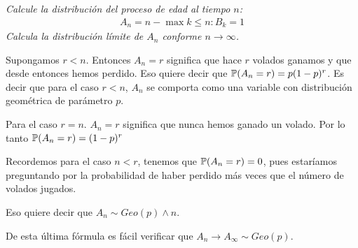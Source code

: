 \emph{
    Calcule la distribución del proceso de edad al tiempo $n$:
    \begin{align}
            A_n = n - \max{k \leq n: B_k = 1}
    \end{align}
    Calcula la distribución límite de $A_n$ conforme $n \rightarrow \infty$.
}

\afterstatement\pn

Supongamos $r < n$. Entonces $A_n = r$ significa que hace $r$ volados ganamos y que desde
entonces hemos perdido. Eso quiere decir que $\P(A_n = r) = p (1-p)^r$. Es decir que para el caso
$r < n$, $A_n$ se comporta como una variable con distribución geométrica de parámetro $p$.\pn

Para el caso $r = n$. $A_n = r$ significa que nunca hemos ganado un volado. Por lo tanto
$\P(A_n = r) = (1-p)^r$\pn

Recordemos para el caso $n < r$, tenemos que $\P(A_n = r) = 0$, pues estaríamos preguntando por la probabilidad
de haber perdido más veces que el número de volados jugados.\pn

Eso quiere decir que $A_n \sim Geo(p) \wedge n$.\pn

De esta última fórmula es fácil verificar que $A_n \rightarrow A_{\infty} \sim Geo(p)$.